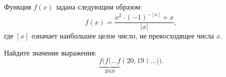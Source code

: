 
Функция $f(x)$ задана следующим образом:
$$f(x)=\dfrac{x^2\cdot(-1)^{-[x]}+x}{|x|},
$$
где $[x]$ означает наибольшее целое число, не превосходящее числа $x$.

Найдите значение выражения: 
$$
\underbrace{f(f(\ldots f}_{2019}(20,19)\ldots )).
$$